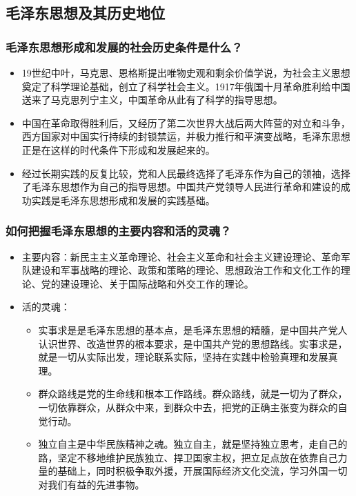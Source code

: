 \documentclass{article}
\begin{document}
\subsection{毛泽东思想及其历史地位}

\subsubsection{毛泽东思想形成和发展的社会历史条件是什么？}
\begin{itemize}
    \item 19世纪中叶，马克思、恩格斯提出唯物史观和剩余价值学说，为社会主义思想奠定了科学理论基础，创立了科学社会主义。1917年俄国十月革命胜利给中国送来了马克思列宁主义，中国革命从此有了科学的指导思想。
    \item 中国在革命取得胜利后，又经历了第二次世界大战后两大阵营的对立和斗争，西方国家对中国实行持续的封锁禁运，并极力推行和平演变战略，毛泽东思想正是在这样的时代条件下形成和发展起来的。
    \item 经过长期实践的反复比较，党和人民最终选择了毛泽东作为自己的领袖，选择了毛泽东思想作为自己的指导思想。中国共产党领导人民进行革命和建设的成功实践是毛泽东思想形成和发展的实践基础。
\end{itemize}

\subsubsection{如何把握毛泽东思想的主要内容和活的灵魂？}
\begin{itemize}
    \item 主要内容：新民主主义革命理论、社会主义革命和社会主义建设理论、革命军队建设和军事战略的理论、政策和策略的理论、思想政治工作和文化工作的理论、党的建设理论、关于国际战略和外交工作的理论。
    \item 活的灵魂：
    \begin{itemize}
        \item 实事求是是毛泽东思想的基本点，是毛泽东思想的精髓，是中国共产党人认识世界、改造世界的根本要求，是中国共产党的思想路线。实事求是，就是一切从实际出发，理论联系实际，坚持在实践中检验真理和发展真理。
        \item 群众路线是党的生命线和根本工作路线。群众路线，就是一切为了群众，一切依靠群众，从群众中来，到群众中去，把党的正确主张变为群众的自觉行动。
        \item 独立自主是中华民族精神之魂。独立自主，就是坚持独立思考，走自己的路，坚定不移地维护民族独立、捍卫国家主权，把立足点放在依靠自己力量的基础上，同时积极争取外援，开展国际经济文化交流，学习外国一切对我们有益的先进事物。
    \end{itemize}
\end{itemize}
\end{document}
